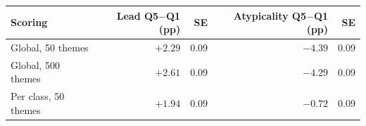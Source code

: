 \begin{tabular}{lrrrr}
\toprule
Scoring & Lead Q5$-$Q1 (pp) & SE & Atypicality Q5$-$Q1 (pp) & SE \\
\midrule
Global, 50 themes & $+2.29$ & 0.09 & $-4.39$ & 0.09 \\
Global, 500 themes & $+2.61$ & 0.09 & $-4.29$ & 0.09 \\
Per class, 50 themes & $+1.94$ & 0.09 & $-0.72$ & 0.09 \\
\bottomrule
\end{tabular}
